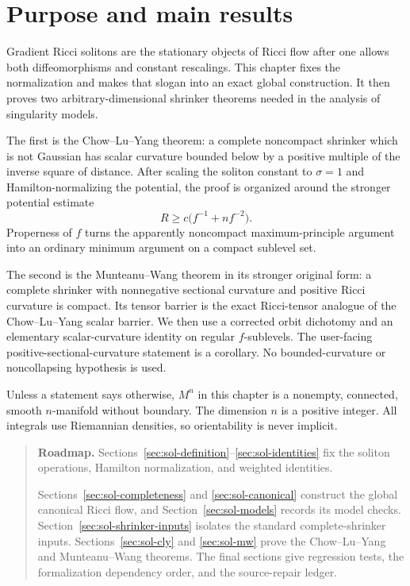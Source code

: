 \documentclass[10pt]{coll-l}
\newenvironment{roadmap}[1]{%
  \begin{quote}\small\noindent\textbf{Roadmap.} #1\par\medskip\noindent
}{\end{quote}}
\theoremstyle{definition}
\theoremstyle{remark}
\numberwithin{section}{chapter}
\numberwithin{equation}{chapter}
\begin{document}
\section{Purpose and main results}
\label{sec:sol-purpose}

Gradient Ricci solitons are the stationary objects of Ricci flow after one
allows both diffeomorphisms and constant rescalings.  This chapter fixes the
normalization and makes that slogan into an exact global construction.  It
then proves two arbitrary-dimensional shrinker theorems needed in the
analysis of singularity models.

The first is the Chow--Lu--Yang theorem: a complete noncompact shrinker
which is not Gaussian has scalar curvature bounded below by a positive
multiple of the inverse square of distance.  After scaling the soliton
constant to $\sigma=1$ and Hamilton-normalizing the potential, the proof is
organized around the stronger potential estimate
\[
                 R\geq c\bigl(f^{-1}+nf^{-2}\bigr).
\]
Properness of $f$ turns the apparently noncompact maximum-principle argument
into an ordinary minimum argument on a compact sublevel set.

The second is the Munteanu--Wang theorem in its stronger original form: a
complete shrinker with nonnegative sectional curvature and positive Ricci
curvature is compact.  Its tensor barrier is the exact Ricci-tensor analogue
of the Chow--Lu--Yang scalar barrier.  We then use a corrected orbit
dichotomy and an elementary scalar-curvature identity on regular
$f$-sublevels.  The user-facing positive-sectional-curvature statement is a
corollary.  No bounded-curvature or noncollapsing hypothesis is used.

Unless a statement says otherwise, $M^n$ in this chapter is a nonempty,
connected, smooth $n$-manifold without boundary.  The dimension $n$ is a
positive integer.  All integrals use Riemannian densities, so orientability
is never implicit.

\begin{roadmap}{Sections~\ref{sec:sol-definition}--\ref{sec:sol-identities}
fix the soliton operations, Hamilton normalization, and weighted identities.}
Sections~\ref{sec:sol-completeness} and \ref{sec:sol-canonical} construct the
global canonical Ricci flow, and Section~\ref{sec:sol-models} records its
model checks.  Section~\ref{sec:sol-shrinker-inputs} isolates
the standard complete-shrinker inputs.  Sections~\ref{sec:sol-cly} and
\ref{sec:sol-mw} prove the Chow--Lu--Yang and Munteanu--Wang theorems.
The final sections give regression tests, the formalization dependency
order, and the source-repair ledger.
\end{roadmap}
\end{document}
